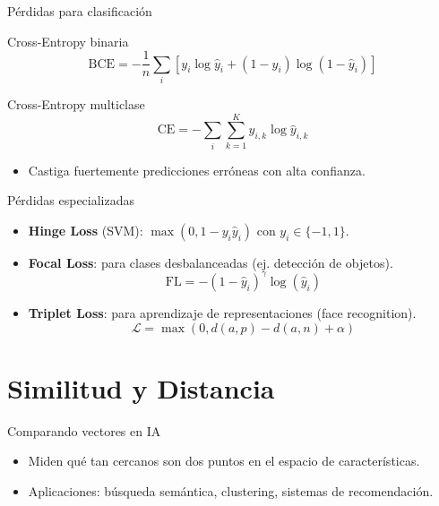 \documentclass[aspectratio=169, 10pt, xcolor=table]{beamer}
\begin{document}
\begin{frame}{Pérdidas para clasificación}
    \begin{block}{Cross-Entropy binaria}
        \[
        \text{BCE} = -\frac{1}{n}\sum_{i}\left[y_i\log\hat{y}_i + (1-y_i)\log(1-\hat{y}_i)\right]
        \]
    \end{block}
    \begin{block}{Cross-Entropy multiclase}
        \[
        \text{CE} = -\sum_{i}\sum_{k=1}^{K} y_{i,k}\log\hat{y}_{i,k}
        \]
    \end{block}
    \begin{itemize}
        \item Castiga fuertemente predicciones erróneas con alta confianza.
    \end{itemize}
\end{frame}

\begin{frame}{Pérdidas especializadas}
    \begin{itemize}
        \item \textbf{Hinge Loss} (SVM): $\max(0, 1 - y_i\hat{y}_i)$ con $y_i \in \{-1,1\}$.
        \item \textbf{Focal Loss}: para clases desbalanceadas (ej. detección de objetos).
        \[
        \text{FL} = -(1-\hat{y}_i)^\gamma \log(\hat{y}_i)
        \]
        \item \textbf{Triplet Loss}: para aprendizaje de representaciones (face recognition).
        \[
        \mathcal{L} = \max(0, d(a,p) - d(a,n) + \alpha)
        \]
    \end{itemize}
\end{frame}

\section{Similitud y Distancia}

\begin{frame}{Comparando vectores en IA}
    \begin{itemize}
        \item Miden qué tan cercanos son dos puntos en el espacio de características.
        \item Aplicaciones: búsqueda semántica, clustering, sistemas de recomendación.
    \end{itemize}
\end{frame}
\end{document}
